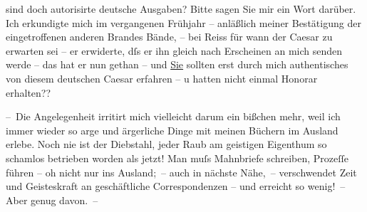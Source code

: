                sind doch autorisirte deutsche Ausgaben? Bitte sagen Sie mir ein Wort darüber. Ich
               erkundigte mich im vergangenen Frühjahr – anläßlich meiner Bestätigung der
               eingetroffenen anderen Brandes Bände, – \introOben{}bei Reiss\introOben{} für wann der Caesar zu erwarten sei – er
               erwiderte, dſs er ihn gleich nach Erscheinen an mich senden werde – das hat er {\pb}nun gethan – und \uline{Sie} sollten erst durch mich authentisches von diesem deutschen Caesar erfahren – u hatten nicht einmal Honorar
               erhalten??\pend
           
\pstart
           – Die Angelegenheit irritirt mich vielleicht darum ein bißchen mehr, weil ich immer
               wieder so arge und ärgerliche Dinge mit meinen Büchern im Ausland erlebe. Noch nie
               ist der Diebstahl, jeder Raub am geistigen Eigenthum so schamlos betrieben worden als
               jetzt! Man muſs Mahnbriefe schreiben, Prozeſſe führen – oh nicht nur ins Ausland; –
               auch in nächste Nähe, – verschwendet Zeit und Geisteskraft an geschäftliche
               Correspondenzen – und erreicht so wenig! – Aber genug davon. –\pend
           
